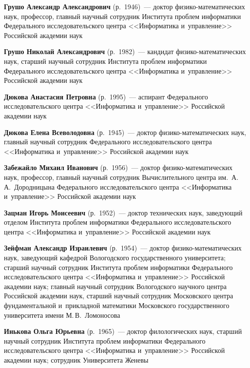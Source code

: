 \begin{multicols}{2}
\vspace*{4pt}


\noindent
\textbf{Грушо Александр Александрович} (р.\ 1946)~--- доктор фи\-зи\-ко-ма\-те\-ма\-ти\-че\-ских наук, 
профессор, главный научный сотрудник Института проб\-лем информатики Федерального исследовательского цент\-ра <<Информатика и~управ\-ле\-ние>> Российской академии наук

\noindent
\textbf{Грушо Николай Александрович} (р.\ 1982)~--- кандидат фи\-зи\-ко-ма\-те\-ма\-ти\-че\-ских наук, 
старший научный сотрудник Института проб\-лем информатики Федерального исследовательского цент\-ра <<Информатика и~управ\-ле\-ние>> Российской академии наук

\noindent
\textbf{Дюкова Анастасия Петровна} (р.\ 1995)~--- 
аспирант Федерального исследовательского цент\-ра <<Информатика и~управ\-ле\-ние>> Российской академии наук

\noindent
\textbf{Дюкова Елена Всеволодовна} (р.\ 1945)~--- 
доктор фи\-зи\-ко-ма\-те\-ма\-ти\-че\-ских наук, главный научный сотрудник Федерального исследовательского цент\-ра 
<<Информатика и~управ\-ле\-ние>> Российской академии наук

\noindent
\textbf{Забежайло Михаил Иванович} (р.\ 1956)~--- доктор фи\-зи\-ко-ма\-те\-ма\-ти\-че\-ских наук, 
профессор, главный научный сотрудник Вычислительного цент\-ра им.\ А.\,А.~Дородницына Федерального исследовательского цент\-ра 
<<Информатика и~управ\-ле\-ние>> Российской академии наук

\noindent
\textbf{Зацман Игорь Моисеевич} (р.\ 1952)~--- 
доктор тех\-нических наук, за\-ве\-ду\-ющий отделом Института проб\-лем информатики Федерального исследовательского цент\-ра 
<<Информатика и~управ\-ле\-ние>> Российской академии наук


\noindent
\textbf{Зейфман Александр Израилевич} (р.\ 1954)~--- доктор фи\-зи\-ко-ма\-те\-ма\-ти\-че\-ских наук,
за\-ве\-ду\-ющий ка\-фед\-рой  Вологодского государственного университета;
старший научный сотрудник Института \mbox{проб\-лем} информатики Федерального исследовательского цент\-ра
<<Информатика и~управ\-ле\-ние>> Российской академии наук;
главный научный сотрудник Вологодского научного цент\-ра Российской академии наук,
старший научный сотрудник Мос\-ков\-ского центра фундаментальной и~при\-клад\-ной математики Московского 
государственного университета имени М.\,В.~Ломоносова 

\noindent
\textbf{Инькова Ольга Юрьевна} (р.\ 1965)~--- 
доктор филологических наук, старший научный сотрудник Института проб\-лем информатики Федерального исследовательского цент\-ра 
<<Информатика и~управ\-ле\-ние>> Российской академии наук; сотрудник Университета Женевы


\end{multicols}
